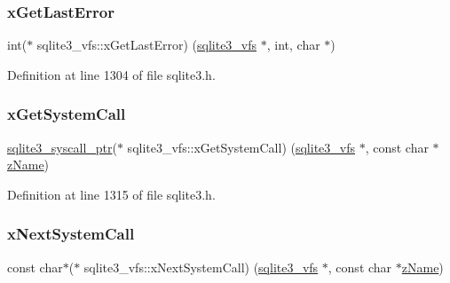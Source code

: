 \mbox{\label{structsqlite3__vfs_ae90895f142cc41801f515ae5e339a3d7}} 
\subsubsection{\texorpdfstring{x\+Get\+Last\+Error}{xGetLastError}}
{\footnotesize\ttfamily int($\ast$ sqlite3\+\_\+vfs\+::x\+Get\+Last\+Error) (\mbox{\hyperlink{structsqlite3__vfs}{sqlite3\+\_\+vfs}} $\ast$, int, char $\ast$)}



Definition at line 1304 of file sqlite3.\+h.

\mbox{\label{structsqlite3__vfs_a1bf78a1603ab605cd92d146e3f810727}} 
\subsubsection{\texorpdfstring{x\+Get\+System\+Call}{xGetSystemCall}}
{\footnotesize\ttfamily \mbox{\hyperlink{sqlite3_8h_a99a6393e96d7095fa024de9c1257aa6f}{sqlite3\+\_\+syscall\+\_\+ptr}}($\ast$ sqlite3\+\_\+vfs\+::x\+Get\+System\+Call) (\mbox{\hyperlink{structsqlite3__vfs}{sqlite3\+\_\+vfs}} $\ast$, const char $\ast$\mbox{\hyperlink{structsqlite3__vfs_a0f06a27ac2201ea04c0623ef19e5d73e}{z\+Name}})}



Definition at line 1315 of file sqlite3.\+h.

\mbox{\label{structsqlite3__vfs_afbd158883d9bb7954fa7ecd595fe3c2b}} 
\subsubsection{\texorpdfstring{x\+Next\+System\+Call}{xNextSystemCall}}
{\footnotesize\ttfamily const char$\ast$($\ast$ sqlite3\+\_\+vfs\+::x\+Next\+System\+Call) (\mbox{\hyperlink{structsqlite3__vfs}{sqlite3\+\_\+vfs}} $\ast$, const char $\ast$\mbox{\hyperlink{structsqlite3__vfs_a0f06a27ac2201ea04c0623ef19e5d73e}{z\+Name}})}



